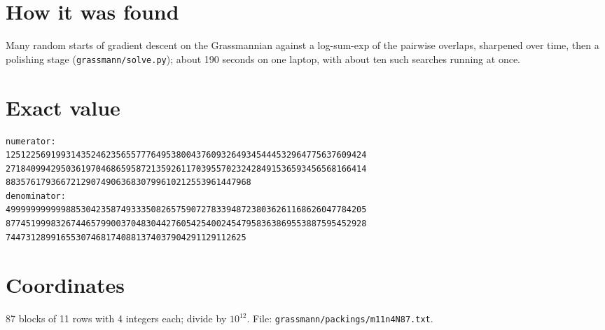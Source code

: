 \documentclass[11pt,a4paper]{article}
\begin{document}
\section{How it was found}
Many random starts of gradient descent on the Grassmannian against a log-sum-exp of the pairwise overlaps, sharpened over time, then a polishing stage (\texttt{grassmann/solve.py}); about 190 seconds on one laptop, with about ten such searches running at once.


\appendix
\section{Exact value}
{\small
\begin{verbatim}
numerator:
125122569199314352462356557776495380043760932649345444532964775637609424
271840994295036197046865958721359261170395570232428491536593456568166414
8835761793667212907490636830799610212553961447968
denominator:
499999999999885304235874933350826575907278339487238036261168626047784205
877451999832674465799003704830442760542540024547958363869553887595452928
744731289916553074681740881374037904291129112625
\end{verbatim}}

\section{Coordinates}
87 blocks of 11 rows with 4 integers each; divide by $10^{12}$. File: \texttt{grassmann/packings/m11n4N87.txt}.
{\tiny
\begin{multicols}{3}
\end{multicols}}
\end{document}
